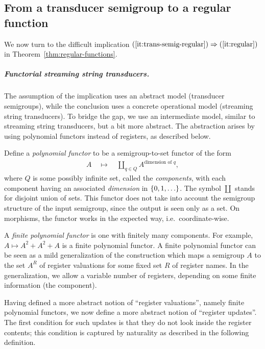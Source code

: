 \subsection{From a transducer semigroup to a regular function}
\label{sec:hard}
We now turn to the difficult implication $(\ref{it:trans-semig-regular}) \Rightarrow (\ref{it:regular})$ in Theorem~\ref{thm:regular-functions}. 

\subparagraph*{Functorial streaming string transducers.}
\label{sec:abstract-sst} 
The assumption of the implication uses an abstract model (transducer semigroups), while the conclusion uses a concrete operational model (streaming string transducers). To bridge the gap, we use an intermediate model, similar to streaming string transducers, but a bit more abstract. The abstraction arises by using polynomial functors instead of registers, as described below. 

Define a \emph{polynomial functor} to be a semigroup-to-set functor of the form
\begin{align*}
A \quad \mapsto \quad \coprod_{q \in Q} A^{\text{dimension of } q},
\end{align*}
where $Q$ is some possibly infinite set, called the \emph{components}, with each  component having an associated \emph{dimension} in $\{0,1,\ldots\}$. The symbol $\coprod$ stands for disjoint union of sets. This functor does not take into account the semigroup structure of the input semigroup, since the output is seen only as a set.
On morphisms, the functor works in the expected way, i.e.~coordinate-wise.  

A \emph{finite polynomial functor} is one with finitely many components. For example, $A \mapsto A^2 + A^2 + A$ is a finite polynomial functor. 
A finite polynomial functor can be seen as a mild generalization of the construction which maps a semigroup $A$ to the set $A^R$ of register valuations for some fixed set $R$ of register names.  In the generalization, we allow a variable number of registers, depending on some finite information (the component). 

Having defined a more abstract notion of ``register valuations'', namely finite polynomial functors, we now define a more abstract notion of ``register updates''.  The first condition for such updates is that they do not look inside the register contents; this condition is captured by naturality as described in the following definition. 



